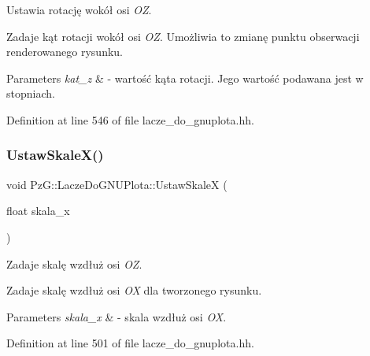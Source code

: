 Ustawia rotację wokół osi {\itshape OZ}. 

Zadaje kąt rotacji wokół osi {\itshape OZ}. Umożliwia to zmianę punktu obserwacji renderowanego rysunku. 
\begin{DoxyParams}{Parameters}
{\em kat\+\_\+z} & -\/ wartość kąta rotacji. Jego wartość podawana jest w stopniach. \\
\hline
\end{DoxyParams}


Definition at line 546 of file lacze\+\_\+do\+\_\+gnuplota.\+hh.

\mbox{\label{class_pz_g_1_1_lacze_do_g_n_u_plota_a855b8338bfe3e5d294d719f24b11090e}} 
\subsubsection{\texorpdfstring{Ustaw\+Skale\+X()}{UstawSkaleX()}}
{\footnotesize\ttfamily void Pz\+G\+::\+Lacze\+Do\+G\+N\+U\+Plota\+::\+Ustaw\+SkaleX (\begin{DoxyParamCaption}\item[{float}]{skala\+\_\+x }\end{DoxyParamCaption})\hspace{0.3cm}{\ttfamily [inline]}}



Zadaje skalę wzdłuż osi {\itshape OZ}. 

Zadaje skalę wzdłuż osi {\itshape OX} dla tworzonego rysunku. 
\begin{DoxyParams}{Parameters}
{\em skala\+\_\+x} & -\/ skala wzdłuż osi {\itshape OX}. \\
\hline
\end{DoxyParams}


Definition at line 501 of file lacze\+\_\+do\+\_\+gnuplota.\+hh.

\mbox{\label{class_pz_g_1_1_lacze_do_g_n_u_plota_a4308151b54e105d302803146a3238699}} 

